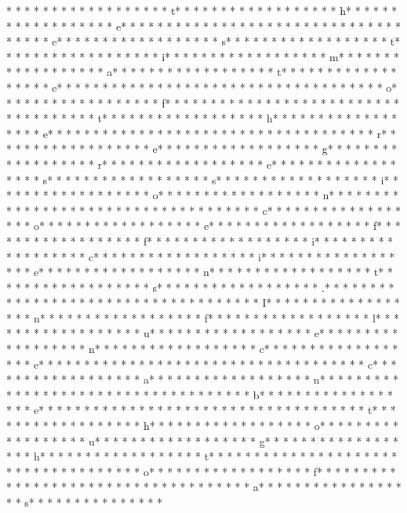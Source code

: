 * * *  * * *  * * *  *  * * *  *  * * *  * t* * *  * * *  * * *  *  * * *  *  * * *  * h* * *  * * *  * * *  *  * * *  *  * * *  * e* * *  * * *  * * *  *  * * *  *  * * *  *  * * *  * * *  * * *  *  * * *  *  * * *  * e* * *  * * *  * * *  *  * * *  *  * * *  * s* * *  * * *  * * *  *  * * *  *  * * *  * t* * *  * * *  * * *  *  * * *  *  * * *  * i* * *  * * *  * * *  *  * * *  *  * * *  * m* * *  * * *  * * *  *  * * *  *  * * *  * a* * *  * * *  * * *  *  * * *  *  * * *  * t* * *  * * *  * * *  *  * * *  *  * * *  * e* * *  * * *  * * *  *  * * *  *  * * *  *  * * *  * * *  * * *  *  * * *  *  * * *  * o* * *  * * *  * * *  *  * * *  *  * * *  * f* * *  * * *  * * *  *  * * *  *  * * *  *  * * *  * * *  * * *  *  * * *  *  * * *  * t* * *  * * *  * * *  *  * * *  *  * * *  * h* * *  * * *  * * *  *  * * *  *  * * *  * e* * *  * * *  * * *  *  * * *  *  * * *  *  * * *  * * *  * * *  *  * * *  *  * * *  * r* * *  * * *  * * *  *  * * *  *  * * *  * e* * *  * * *  * * *  *  * * *  *  * * *  * g* * *  * * *  * * *  *  * * *  *  * * *  * r* * *  * * *  * * *  *  * * *  *  * * *  * e* * *  * * *  * * *  *  * * *  *  * * *  * s* * *  * * *  * * *  *  * * *  *  * * *  * s* * *  * * *  * * *  *  * * *  *  * * *  * i* * *  * * *  * * *  *  * * *  *  * * *  * o* * *  * * *  * * *  *  * * *  *  * * *  * n* * *  * * *  * * *  *  * * *  *  * * *  *  * * *  * * *  * * *  *  * * *  *  * * *  * c* * *  * * *  * * *  *  * * *  *  * * *  * o* * *  * * *  * * *  *  * * *  *  * * *  * e* * *  * * *  * * *  *  * * *  *  * * *  * f* * *  * * *  * * *  *  * * *  *  * * *  * f* * *  * * *  * * *  *  * * *  *  * * *  * i* * *  * * *  * * *  *  * * *  *  * * *  * c* * *  * * *  * * *  *  * * *  *  * * *  * i* * *  * * *  * * *  *  * * *  *  * * *  * e* * *  * * *  * * *  *  * * *  *  * * *  * n* * *  * * *  * * *  *  * * *  *  * * *  * t* * *  * * *  * * *  *  * * *  *  * * *  * s* * *  * * *  * * *  *  * * *  *  * * *  * .* * *  * * *  * * *  *  * * *  *  * * *  *  * * *  * * *  * * *  *  * * *  *  * * *  * I* * *  * * *  * * *  *  * * *  *  * * *  * n* * *  * * *  * * *  *  * * *  *  * * *  * f* * *  * * *  * * *  *  * * *  *  * * *  * l* * *  * * *  * * *  *  * * *  *  * * *  * u* * *  * * *  * * *  *  * * *  *  * * *  * e* * *  * * *  * * *  *  * * *  *  * * *  * n* * *  * * *  * * *  *  * * *  *  * * *  * c* * *  * * *  * * *  *  * * *  *  * * *  * e* * *  * * *  * * *  *  * * *  *  * * *  *  * * *  * * *  * * *  *  * * *  *  * * *  * c* * *  * * *  * * *  *  * * *  *  * * *  * a* * *  * * *  * * *  *  * * *  *  * * *  * n* * *  * * *  * * *  *  * * *  *  * * *  *  * * *  * * *  * * *  *  * * *  *  * * *  * b* * *  * * *  * * *  *  * * *  *  * * *  * e* * *  * * *  * * *  *  * * *  *  * * *  *  * * *  * * *  * * *  *  * * *  *  * * *  * t* * *  * * *  * * *  *  * * *  *  * * *  * h* * *  * * *  * * *  *  * * *  *  * * *  * o* * *  * * *  * * *  *  * * *  *  * * *  * u* * *  * * *  * * *  *  * * *  *  * * *  * g* * *  * * *  * * *  *  * * *  *  * * *  * h* * *  * * *  * * *  *  * * *  *  * * *  * t* * *  * * *  * * *  *  * * *  *  * * *  *  * * *  * * *  * * *  *  * * *  *  * * *  * o* * *  * * *  * * *  *  * * *  *  * * *  * f* * *  * * *  * * *  *  * * *  *  * * *  *  * * *  * * *  * * *  *  * * *  *  * * *  * a* * *  * * *  * * *  *  * * *  *  * * *  * s* * *  * * *  * * *  *  * * *  *  * 